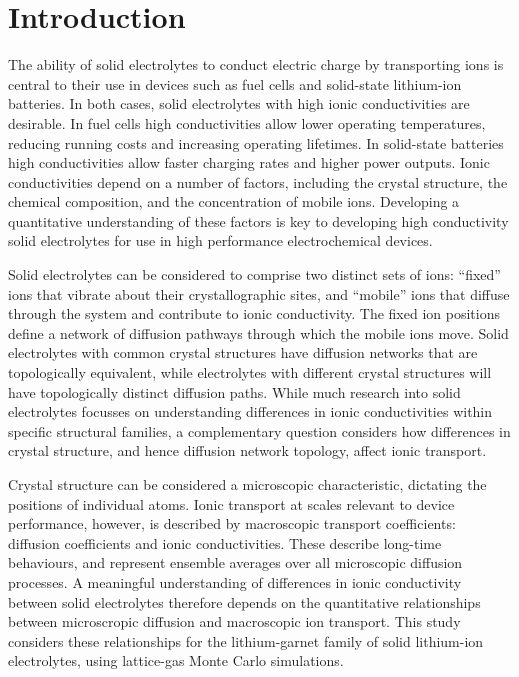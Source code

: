 \documentclass[aps,prb,twocolumn,superscriptaddress,reprint]{revtex4-1}
\begin{document}
\maketitle

\section{Introduction}

The ability of solid electrolytes to conduct electric charge by transporting  ions is central to their use in devices such as fuel cells and solid-state lithium-ion batteries.\cite{BachmanEtAl_ChemRev2016, ManthiramEtAl_NatRevMater2017,GoodenoughAndSingh_JElectrochemSoc2015, MalavasiEtAl_ChemSocRev2010} In both cases, solid electrolytes with high ionic conductivities are desirable. In fuel cells high conductivities allow lower operating temperatures, reducing running costs and increasing operating lifetimes. In solid-state batteries high conductivities allow faster charging rates and higher power outputs. Ionic conductivities depend on a number of factors, including the crystal structure, the chemical composition, and the concentration of mobile ions.\cite{VanDerVenEtAl_AccChemRes2013} Developing a quantitative understanding of these factors is key to developing high conductivity solid electrolytes for use in high performance electrochemical devices.

Solid electrolytes can be considered to comprise two distinct sets of ions: ``fixed'' ions that vibrate about their crystallographic sites, and ``mobile'' ions that diffuse through the system and contribute to ionic conductivity. The fixed ion positions define a network of diffusion pathways through which the mobile ions move. Solid electrolytes with common crystal structures have  diffusion networks that are topologically equivalent, while electrolytes with different crystal structures will have topologically distinct diffusion paths. While much research into solid electrolytes focusses on understanding differences in ionic conductivities within specific structural families, a complementary question considers how differences in crystal structure, and hence diffusion network topology, affect ionic transport.

Crystal structure can be considered a microscopic characteristic, dictating the positions of individual atoms. Ionic transport at scales relevant to device performance, however, is described by macroscopic transport coefficients: diffusion coefficients and ionic conductivities. These describe long-time behaviours, and represent ensemble averages over all microscopic diffusion processes. A meaningful understanding of differences in ionic conductivity between solid electrolytes therefore depends on the quantitative relationships between microscropic diffusion and macroscopic ion transport. This study considers these relationships for the lithium-garnet family of solid lithium-ion electrolytes, using lattice-gas Monte Carlo simulations.
\end{document}
